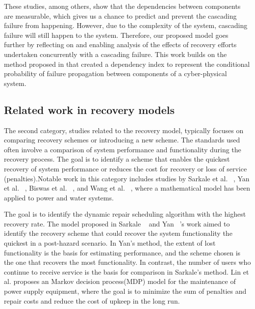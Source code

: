 \documentclass[conference]{IEEEtran}
\begin{document}
These studies, among others, show that the dependencies between components are measurable, which gives us a chance to predict and prevent the cascading failure from happening. However, due to the complexity of the system, cascading failure will still happen to the system. Therefore, our proposed model goes further by reflecting on and enabling analysis of the effects of recovery efforts undertaken concurrently with a cascading failure. This work builds on the method proposed in \cite{redacted} that created a dependency index to represent the conditional probability of failure propagation between components of a cyber-physical system. 

\subsection{Related work in recovery models}

The second category, studies related to the recovery model, typically focuses on comparing recovery schemes or introducing a new scheme. The standards used often involve a comparison of system performance and functionality during the recovery process. The goal is to identify a scheme that enables the quickest recovery of system performance or reduces the cost for recovery or loss of service (penalties).Notable work in this category includes studies by Sarkale et al. ~\cite{sarkale_solving_2018}, Yan et al. ~\cite{yan_dynamic_2021}, Biswas et al. ~\cite{biswas_repair_2025}, and Wang et al. ~\cite{wang_q-learning-based_2025}, where a mathematical model has been applied to power and water systems. 

The goal is to identify the dynamic repair scheduling algorithm with the highest recovery rate. The model proposed in Sarkale ~\cite{sarkale_solving_2018} and Yan ~\cite{yan_dynamic_2021}'s work aimed to identify the recovery scheme that could recover the system functionality the quickest in a post-hazard scenario. 
In Yan's method, the extent of lost functionality is the basis for estimating performance, and the scheme chosen is the one that recovers the most functionality. In contrast, the number of users who continue to receive service is the basis for comparison in Sarkale's method. 
Lin et al. \cite{lin_condition-based_2022} proposes an  Markov decision process(MDP) model for the maintenance of power supply equipment, where the goal is to minimize the sum of penalties and repair costs and reduce the cost of upkeep in the long run. 
\end{document}
